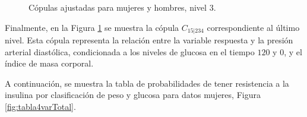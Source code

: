 \begin{figure}[H]
 \centering
    \caption{Cópulas ajustadas para mujeres y hombres, nivel $3$.}
    \label{fig:Modelo4TotalNivel4}
\end{figure}

Finalmente, en la Figura \ref{fig:Modelo4TotalNivel4} se muestra la cópula $C_{15|234}$ correspondiente al último nivel. Esta cópula representa la relación entre la variable respuesta y la presión arterial diastólica, condicionada a los niveles de glucosa en el tiempo $120$ y $0$, y el índice de masa corporal.

A continuación, se muestra la tabla de probabilidades de tener resistencia a la insulina por clasificación de peso y glucosa para datos mujeres, Figura \ref{fig:tabla4varTotal}.



